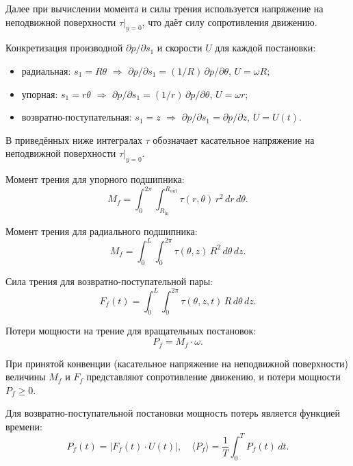 Далее при вычислении момента и силы трения используется напряжение
на неподвижной поверхности $\tau|_{y=0}$, что даёт силу сопротивления
движению.

Конкретизация производной $\partial p/\partial s_1$ и скорости $U$
для каждой постановки:
\begin{itemize}
  \item радиальная: $s_1 = R\theta$ $\Rightarrow$
        $\partial p/\partial s_1 = (1/R)\,\partial p/\partial\theta$,\;
        $U = \omega R$;
  \item упорная: $s_1 = r\theta$ $\Rightarrow$
        $\partial p/\partial s_1 = (1/r)\,\partial p/\partial\theta$,\;
        $U = \omega r$;
  \item возвратно-поступательная: $s_1 = z$ $\Rightarrow$
        $\partial p/\partial s_1 = \partial p/\partial z$,\;
        $U = U(t)$.
\end{itemize}

В приведённых ниже интегралах $\tau$ обозначает касательное
напряжение на неподвижной поверхности $\tau|_{y=0}$.

Момент трения для упорного подшипника:
\begin{equation}
  M_f = \int_0^{2\pi}\!\int_{R_{\mathrm{in}}}^{R_{\mathrm{out}}}
    \tau(r,\theta)\,r^2\,dr\,d\theta.
  \label{eq:func_Mf_thrust}
\end{equation}

Момент трения для радиального подшипника:
\begin{equation}
  M_f = \int_0^L\!\int_0^{2\pi}
    \tau(\theta,z)\,R^2\,d\theta\,dz.
  \label{eq:func_Mf_journal}
\end{equation}

Сила трения для возвратно-поступательной пары:
\begin{equation}
  F_f(t) = \int_0^L\!\int_0^{2\pi}
    \tau(\theta,z,t)\,R\,d\theta\,dz.
  \label{eq:func_Ff_recip}
\end{equation}

Потери мощности на трение для вращательных постановок:
\begin{equation}
  P_f = M_f \cdot \omega.
  \label{eq:func_Pf_rot}
\end{equation}

При принятой конвенции (касательное напряжение на неподвижной
поверхности) величины $M_f$ и $F_f$ представляют сопротивление
движению, и потери мощности $P_f \geq 0$.

Для возвратно-поступательной постановки мощность потерь является
функцией времени:
\begin{equation}
  P_f(t) = |F_f(t) \cdot U(t)|,
  \quad
  \langle P_f \rangle = \frac{1}{T}\int_0^T P_f(t)\,dt.
  \label{eq:func_Pf_recip}
\end{equation}


